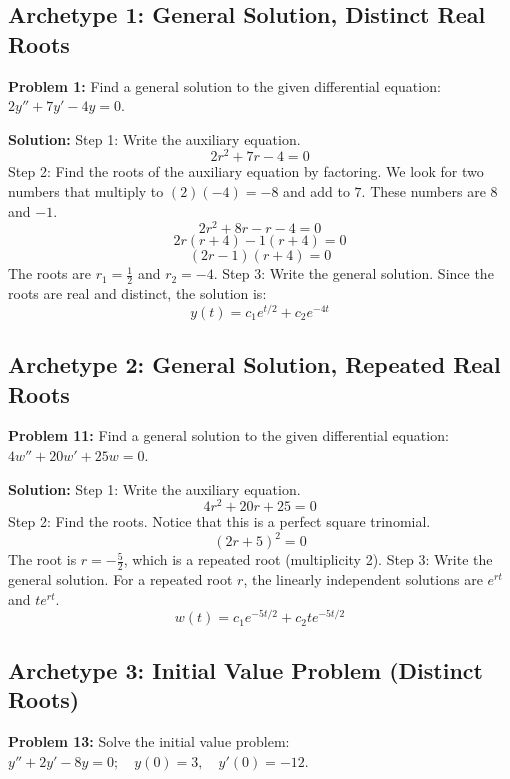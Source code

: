 \documentclass[12pt]{article}
\begin{document}
\subsection{Archetype 1: General Solution, Distinct Real Roots}
\textbf{Problem 1:} Find a general solution to the given differential equation: $2y'' + 7y' - 4y = 0$.

\textbf{Solution:}
Step 1: Write the auxiliary equation.
\[ 2r^2 + 7r - 4 = 0 \]
Step 2: Find the roots of the auxiliary equation by factoring.
We look for two numbers that multiply to $(2)(-4) = -8$ and add to $7$. These numbers are $8$ and $-1$.
\[ 2r^2 + 8r - r - 4 = 0 \]
\[ 2r(r + 4) - 1(r + 4) = 0 \]
\[ (2r - 1)(r + 4) = 0 \]
The roots are $r_1 = \frac{1}{2}$ and $r_2 = -4$.
Step 3: Write the general solution. Since the roots are real and distinct, the solution is:
\[ y(t) = c_1 e^{t/2} + c_2 e^{-4t} \]

\subsection{Archetype 2: General Solution, Repeated Real Roots}
\textbf{Problem 11:} Find a general solution to the given differential equation: $4w'' + 20w' + 25w = 0$.

\textbf{Solution:}
Step 1: Write the auxiliary equation.
\[ 4r^2 + 20r + 25 = 0 \]
Step 2: Find the roots. Notice that this is a perfect square trinomial.
\[ (2r + 5)^2 = 0 \]
The root is $r = -\frac{5}{2}$, which is a repeated root (multiplicity 2).
Step 3: Write the general solution. For a repeated root $r$, the linearly independent solutions are $e^{rt}$ and $t e^{rt}$.
\[ w(t) = c_1 e^{-5t/2} + c_2 t e^{-5t/2} \]

\subsection{Archetype 3: Initial Value Problem (Distinct Roots)}
\textbf{Problem 13:} Solve the initial value problem: $y'' + 2y' - 8y = 0; \quad y(0) = 3, \quad y'(0) = -12$.
\end{document}
